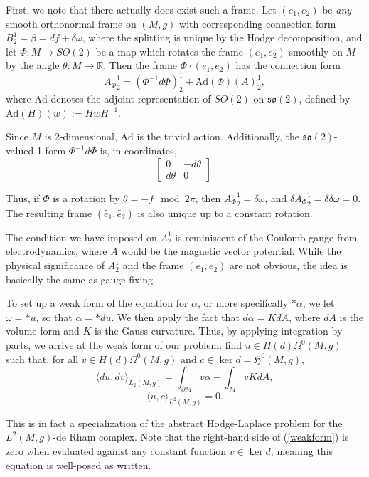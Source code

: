 \documentclass[11pt]{article}
\newcommand{\iprod}[1]{\langle #1 \rangle}
\begin{document}
First, we note that there actually does exist such a frame. Let $(e_1,e_2)$ be \emph{any} smooth orthonormal frame on $(M,g)$ with corresponding connection form $B^1_2 = \beta = df + \delta \omega$, where the splitting is unique by the Hodge decomposition, and let $\Phi: M \to SO(2)$ be a map which rotates the frame $(e_1,e_2)$ smoothly on $M$ by the angle $\theta: M \to \mathbb{R}$. Then the frame $\Phi \cdot (e_1,e_2)$ has the connection form 
\[{A_\Phi}^1_2 = (\Phi^{-1}d\Phi)^1_2 + \mathrm{Ad}(\Phi)(A)^1_2,\] 
where $\mathrm{Ad}$ denotes the adjoint representation of $SO(2)$  on $\mathfrak{so}(2)$, defined by $\mathrm{Ad}(H)(w) := H w H^{-1}$.

Since $M$ is 2-dimensional, $\mathrm{Ad}$ is the trivial action. Additionally, the $\mathfrak{so}(2)$-valued 1-form $\Phi^{-1}d\Phi$ is, in coordinates, 
\[\begin{bmatrix}0 & -d\theta \\ d\theta & 0\end{bmatrix}.\]

Thus, if $\Phi$ is a rotation by $\theta = -f \mod 2\pi$, then ${A_\Phi}^1_2 = \delta \omega$, and $\delta {A_\Phi}^1_2 = \delta \delta \omega = 0$. The resulting frame $(\tilde{e_1},\tilde{e_2})$ is also unique up to a constant rotation.

The condition we have imposed on $A^1_2$ is reminiscent of the Coulomb gauge from electrodynamics, where $A$ would be the magnetic vector potential. While the physical significance of $A^1_2$ and the frame $(e_1,e_2)$ are not obvious, the idea is basically the same as gauge fixing.

To set up a weak form of the equation for $\alpha$, or more specifically $*\alpha$, we let $\omega = *u$, so that $\alpha = *du$. We then apply the fact that $d\alpha = KdA$, where $dA$ is the volume form and $K$ is the Gauss curvature. Thus, by applying integration by parts, we arrive at the weak form of our problem: find $u \in H(d)\Omega^0(M,g)$ such that, for all $v \in H(d)\Omega^0(M,g)$ and $c \in \ker d = \mathfrak{H}^0(M,g)$,
\begin{equation}\label{weakform}\iprod{du,dv}_{L_2(M,g)}  = \int_{\partial M} v\alpha - \int_M vKdA,\end{equation}
\begin{equation}\label{weakformbc}\iprod{u,c}_{L^2(M,g)} = 0. \end{equation}

This is in fact a specialization of the abstract Hodge-Laplace problem for the $L^2(M,g)$-de Rham complex. Note that the right-hand side of (\ref{weakform}) is zero when evaluated against any constant function $v \in \ker d$,  meaning this equation is well-posed as written.
\end{document}
